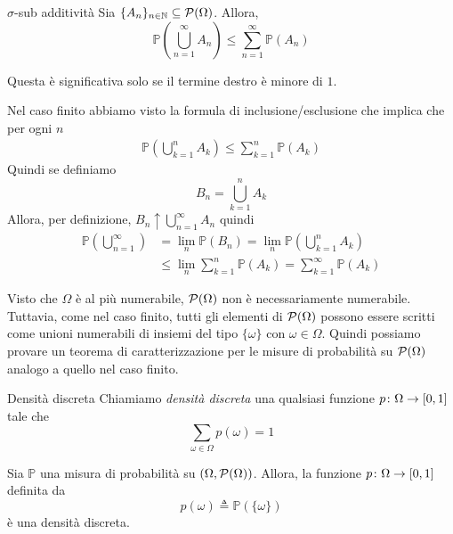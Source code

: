 \documentclass[a4paper]{article}
\begin{document}
\begin{snippetproposition}{\(\sigma\)-sub additività}
    Sia \(\{A_n\}_{n \in \mathbb{N}} \subseteq \mathcal P(\Omega)\).
    Allora, \[
        \mathbb P \left(
            \bigcup_{n=1}^\infty A_n
        \right) \leq \sum_{n=1}^\infty \mathbb P(A_n)
    \]
\end{snippetproposition}

Questa è significativa solo se il termine destro è minore di \(1\).

\begin{snippetproof}{}
    Nel caso finito abbiamo visto la formula di inclusione/esclusione
    che implica che per ogni \(n\)
    \begin{align*}
        \mathbb P \left(
            \bigcup_{k=1}^n A_k
        \right)
        \leq \sum_{k=1}^n \mathbb P(A_k)
    \end{align*}
    Quindi se definiamo \[
        B_n = \bigcup_{k=1}^n A_k
    \]
    Allora, per definizione, \(B_n \uparrow \bigcup_{n=1}^\infty A_n\)
    quindi
    \begin{align*}
        \mathbb P\left(
            \bigcup_{n=1}^\infty
        \right)
        &= \lim_n \mathbb P(B_n)
        = \lim_n \mathbb P \left(
            \bigcup_{k=1}^n A_k
        \right) \\
        &\leq \lim_n \sum_{k=1}^n \mathbb P(A_k)
        = \sum_{k=1}^\infty \mathbb P(A_k)
    \end{align*}
\end{snippetproof}

Visto che \(\Omega\) è al più numerabile, \(\mathcal P(\Omega)\) non è necessariamente numerabile.
Tuttavia, come nel caso finito, tutti gli elementi di \(\mathcal P(\Omega)\)
possono essere scritti come unioni numerabili di insiemi del tipo
\(\{\omega\}\) con \(\omega \in \Omega\).
Quindi possiamo provare un teorema di caratterizzazione per le misure di probabilità
su \(\mathcal P(\Omega)\) analogo a quello nel caso finito.

\begin{snippetdefinition}{Densità discreta}
    Chiamiamo \emph{densità discreta}
    una qualsiasi funzione \(p \colon \Omega \to [0,1]\) tale che
    \[
        \sum_{\omega \in \Omega} p(\omega) = 1
    \]
\end{snippetdefinition}

\begin{snippetproposition}{}
    Sia \(\mathbb P\) una misura di probabilità su \((\Omega, \mathcal P(\Omega))\).
    Allora, la funzione \(p \colon \Omega \to [0,1]\) definita da
    \[
        p(\omega) \triangleq \mathbb P(\{\omega\})
    \]
    è una densità discreta.
\end{snippetproposition}
\end{document}
